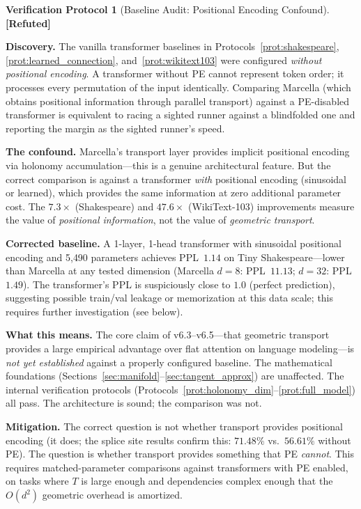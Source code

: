 \documentclass[11pt,a4paper]{article}
\theoremstyle{definition}
\newtheorem{protocol}[theorem]{Verification Protocol}
\theoremstyle{remark}
\newcommand{\statusrefuted}{\textcolor{red!90!black}{\textbf{[Refuted]}}}
\begin{document}
\begin{protocol}[Baseline Audit: Positional Encoding 
Confound]\label{prot:baseline_audit}
\statusrefuted

\textbf{Discovery.} The vanilla transformer baselines in 
Protocols~\ref{prot:shakespeare}, \ref{prot:learned_connection}, 
and~\ref{prot:wikitext103} were configured \emph{without 
positional encoding}. A transformer without PE cannot represent 
token order; it processes every permutation of the input 
identically. Comparing Marcella (which obtains positional 
information through parallel transport) against a PE-disabled 
transformer is equivalent to racing a sighted runner against a 
blindfolded one and reporting the margin as the sighted runner's 
speed.

\textbf{The confound.} Marcella's transport layer provides 
implicit positional encoding via holonomy accumulation---this is 
a genuine architectural feature. But the correct comparison is 
against a transformer \emph{with} positional encoding (sinusoidal 
or learned), which provides the same information at zero 
additional parameter cost. The $7.3\times$ (Shakespeare) and 
$47.6\times$ (WikiText-103) improvements measure the value of 
\emph{positional information}, not the value of \emph{geometric 
transport}.

\textbf{Corrected baseline.} A 1-layer, 1-head transformer with 
sinusoidal positional encoding and 5{,}490 parameters achieves 
PPL~$\mathbf{1.14}$ on Tiny Shakespeare---lower than Marcella at 
any tested dimension (Marcella $d = 8$: PPL~$11.13$; $d = 32$: 
PPL~$1.49$). The transformer's PPL is suspiciously close to 
$1.0$ (perfect prediction), suggesting possible train/val 
leakage or memorization at this data scale; this requires 
further investigation (see below).

\textbf{What this means.} The core claim of v6.3--v6.5---that 
geometric transport provides a large empirical advantage over 
flat attention on language modeling---is \emph{not yet 
established} against a properly configured baseline. The 
mathematical foundations (Sections~\ref{sec:manifold}--\ref{sec:tangent_approx}) 
are unaffected. The internal verification protocols 
(Protocols~\ref{prot:holonomy_dim}--\ref{prot:full_model}) 
all pass. The architecture is sound; the comparison was not.

\textbf{Mitigation.} The correct question is not whether 
transport provides positional encoding (it does; the splice 
site results confirm this: $71.48\%$ vs.\ $56.61\%$ without PE). 
The question is whether transport provides something that 
PE \emph{cannot}. This requires matched-parameter comparisons 
against transformers with PE enabled, on tasks where 
$T$ is large enough and dependencies complex enough that 
the $O(d^2)$ geometric overhead is amortized.
\end{protocol}
\end{document}
